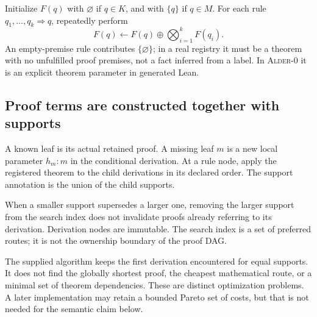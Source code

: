 \documentclass[11pt,a4paper]{article}
\newcommand{\Alder}{\textsc{Alder}}
\theoremstyle{plain}
\theoremstyle{definition}
\theoremstyle{remark}
\begin{document}
Initialize $F(q)$ with $\varnothing$ if $q\in K$, and with $\{q\}$ if $q\in M$. For each rule $q_1,\ldots,q_k\Rightarrow q$, repeatedly perform
\begin{equation}\label{eq:horn-update}
 F(q)\leftarrow F(q)\oplus\bigotimes_{i=1}^k F(q_i).
\end{equation}
An empty-premise rule contributes $\{\varnothing\}$; in a real registry it must be a theorem with no unfulfilled proof premises, not a fact inferred from a label. In \Alder{}-0 it is an explicit theorem parameter in generated Lean.

\subsection{Proof terms are constructed together with supports}
A known leaf is its actual retained proof. A missing leaf $m$ is a new local parameter $h_m:m$ in the conditional derivation. At a rule node, apply the registered theorem to the child derivations in its declared order. The support annotation is the union of the child supports.

When a smaller support supersedes a larger one, removing the larger support from the search index does not invalidate proofs already referring to its derivation. Derivation nodes are immutable. The search index is a set of preferred routes; it is not the ownership boundary of the proof DAG.

The supplied algorithm keeps the first derivation encountered for equal supports. It does not find the globally shortest proof, the cheapest mathematical route, or a minimal set of theorem dependencies. These are distinct optimization problems. A later implementation may retain a bounded Pareto set of costs, but that is not needed for the semantic claim below.
\end{document}
